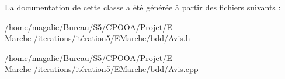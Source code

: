 La documentation de cette classe a été générée à partir des fichiers suivants \-:\begin{DoxyCompactItemize}
\item 
/home/magalie/\-Bureau/\-S5/\-C\-P\-O\-O\-A/\-Projet/\-E-\/\-Marche-\//iterations/itération5/\-E\-Marche/bdd/\hyperlink{_avis_8h}{Avis.\-h}\item 
/home/magalie/\-Bureau/\-S5/\-C\-P\-O\-O\-A/\-Projet/\-E-\/\-Marche-\//iterations/itération5/\-E\-Marche/bdd/\hyperlink{_avis_8cpp}{Avis.\-cpp}\end{DoxyCompactItemize}
